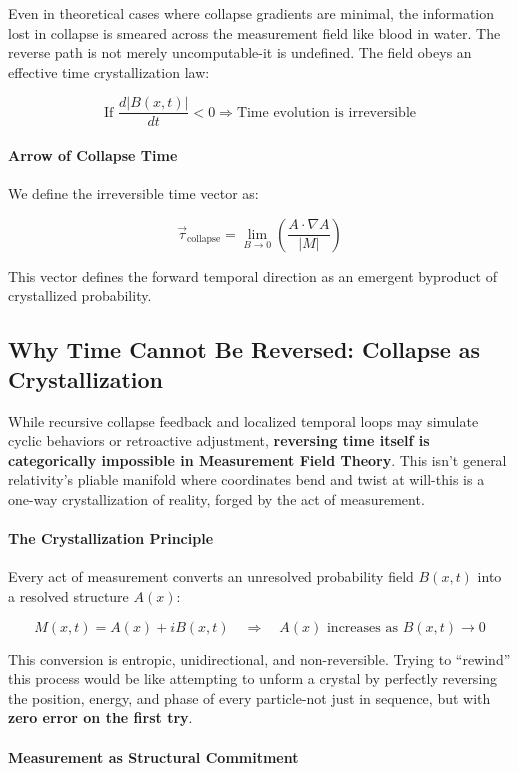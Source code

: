 Even in theoretical cases where collapse gradients are minimal, the information lost in collapse is smeared across the measurement field like blood in water. \cite{chapter_time} The reverse path is not merely uncomputable-it is undefined. The field obeys an effective time crystallization law:

\[
\text{If } \frac{d|B(x,t)|}{dt} < 0 \Rightarrow \text{Time evolution is irreversible}
\]

\paragraph{Arrow of Collapse Time}

We define the irreversible time vector as:

\[
\vec{\tau}_{\text{collapse}} = \lim_{B \to 0} \left( \frac{A \cdot \nabla A}{|M|} \right)
\]

This vector defines the forward temporal direction as an emergent byproduct of crystallized probability. \cite{chapter_time} \subsection*{Why Time Cannot Be Reversed: Collapse as Crystallization}

While recursive collapse feedback and localized temporal loops may simulate cyclic behaviors or retroactive adjustment, \textbf{reversing time itself is categorically impossible in Measurement Field Theory}. \cite{chapter_time} This isn't general relativity's pliable manifold where coordinates bend and twist at will-this is a one-way crystallization of reality, forged by the act of measurement. \cite{chapter_time} \paragraph{The Crystallization Principle}

Every act of measurement converts an unresolved probability field $B(x,t)$ into a resolved structure $A(x)$:

\[
M(x,t) = A(x) + iB(x,t) \quad \Rightarrow \quad A(x) \text{ increases as } B(x,t) \to 0
\]

This conversion is entropic, unidirectional, and non-reversible. \cite{chapter_time} Trying to “rewind” this process would be like attempting to unform a crystal by perfectly reversing the position, energy, and phase of every particle-not just in sequence, but with \textbf{zero error on the first try}. \cite{chapter_time} \paragraph{Measurement as Structural Commitment}

